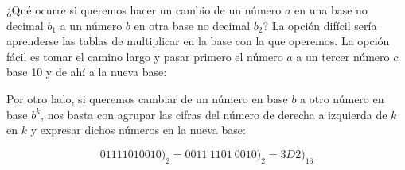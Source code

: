 \begin{center}
\end{center}

¿Qué ocurre si queremos hacer un cambio de un número $a$ en una base no decimal $b_1$ a un número $b$ en otra base no decimal $b_2$?
La opción difícil sería aprenderse las tablas de multiplicar en la base con la que operemos.
La opción fácil es tomar el camino largo y pasar primero el número $a$ a un tercer número $c$ base 10 y de ahí a la nueva base:

\begin{center}
\end{center}

Por otro lado, si queremos cambiar de un número en base $b$ a otro número en base $b^k$, nos basta con agrupar las cifras del número de derecha a izquierda de $k$ en $k$ y expresar dichos números en la nueva base:

\[01111010010\big)_2 = 0011\ 1101\ 0010\big)_2 = 3D2\big)_{16}\]
